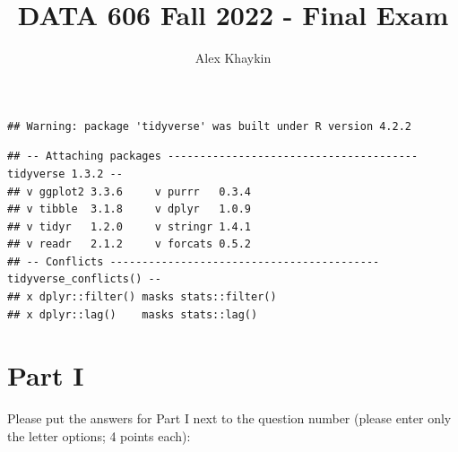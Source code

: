 \documentclass[
]{article}
\title{DATA 606 Fall 2022 - Final Exam}
\author{Alex Khaykin}
\date{}
\begin{document}
\maketitle

\begin{verbatim}
## Warning: package 'tidyverse' was built under R version 4.2.2
\end{verbatim}

\begin{verbatim}
## -- Attaching packages --------------------------------------- tidyverse 1.3.2 --
## v ggplot2 3.3.6     v purrr   0.3.4
## v tibble  3.1.8     v dplyr   1.0.9
## v tidyr   1.2.0     v stringr 1.4.1
## v readr   2.1.2     v forcats 0.5.2
## -- Conflicts ------------------------------------------ tidyverse_conflicts() --
## x dplyr::filter() masks stats::filter()
## x dplyr::lag()    masks stats::lag()
\end{verbatim}

\hypertarget{part-i}{%
\section{Part I}\label{part-i}}

Please put the answers for Part I next to the question number (please
enter only the letter options; 4 points each):
\end{document}
